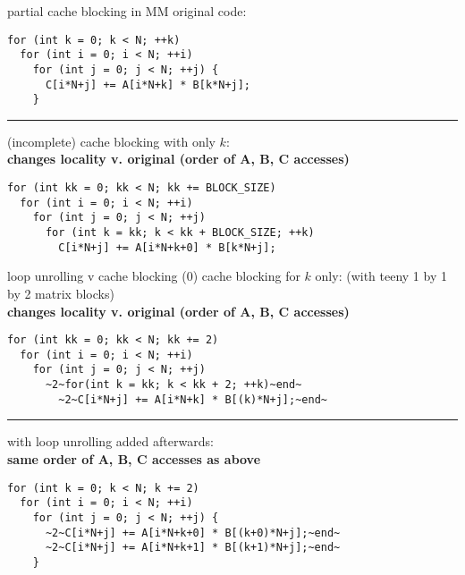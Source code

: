 \begin{frame}[fragile,label=loopUnrollVCacheBlockingIntro2]{partial cache blocking in MM}
\lstset{
    style=smaller,language=C
}
original code:
\begin{lstlisting}
for (int k = 0; k < N; ++k) 
  for (int i = 0; i < N; ++i)
    for (int j = 0; j < N; ++j) {
      C[i*N+j] += A[i*N+k] * B[k*N+j];
    }
\end{lstlisting}
\hrule
    (incomplete) cache blocking with only $k$: \\
    \textbf{changes locality v. original (order of A, B, C accesses)}
\begin{lstlisting}
for (int kk = 0; kk < N; kk += BLOCK_SIZE) 
  for (int i = 0; i < N; ++i)
    for (int j = 0; j < N; ++j)
      for (int k = kk; k < kk + BLOCK_SIZE; ++k)
        C[i*N+j] += A[i*N+k+0] * B[k*N+j];
\end{lstlisting}
\end{frame}

\begin{frame}[fragile,label=loopUnrollVCacheBlocking0]{loop unrolling v cache blocking (0)}
cache blocking for $k$ only: {\small (with teeny 1 by 1 by 2 matrix blocks)} \\
\textbf{changes locality v. original (order of A, B, C accesses)}
\begin{lstlisting}
for (int kk = 0; kk < N; kk += 2)
  for (int i = 0; i < N; ++i)
    for (int j = 0; j < N; ++j)
      ~2~for(int k = kk; k < kk + 2; ++k)~end~
        ~2~C[i*N+j] += A[i*N+k] * B[(k)*N+j];~end~
\end{lstlisting}
\hrule
with loop unrolling added afterwards: \\
\textbf{same order of A, B, C accesses as above}
\begin{lstlisting}
for (int k = 0; k < N; k += 2)
  for (int i = 0; i < N; ++i)
    for (int j = 0; j < N; ++j) {
      ~2~C[i*N+j] += A[i*N+k+0] * B[(k+0)*N+j];~end~
      ~2~C[i*N+j] += A[i*N+k+1] * B[(k+1)*N+j];~end~
    }
\end{lstlisting}
\end{frame}

